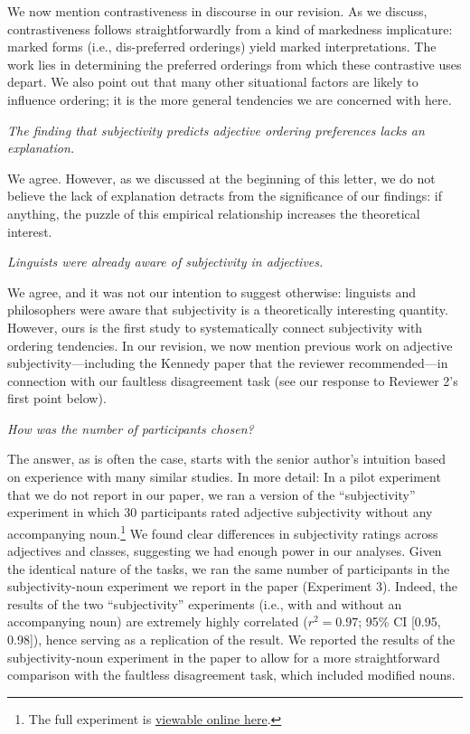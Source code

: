\documentclass[12pt]{article}
\begin{document}
We now mention contrastiveness in discourse in our revision. As we discuss, contrastiveness follows straightforwardly from a kind of markedness implicature: marked forms (i.e., dis-preferred orderings) yield marked interpretations. The work lies in determining the preferred orderings from which these contrastive uses depart.
We also point out that many other situational factors are likely to influence ordering; it is the more general tendencies we are concerned with here. %


\item \emph{The finding that subjectivity predicts adjective ordering preferences lacks an explanation.}

We agree. However, as we discussed at the beginning of this letter, we do not believe the lack of explanation detracts from the significance of our findings: if anything, the puzzle of this empirical relationship increases the theoretical interest.


\item \emph{Linguists were already aware of subjectivity in adjectives.}

We agree, and it was not our intention to suggest otherwise: linguists and philosophers were aware that subjectivity is a theoretically interesting quantity. However, ours is the first study to systematically connect subjectivity with ordering tendencies. In our revision, we now mention previous work on adjective subjectivity---including the Kennedy paper that the reviewer recommended---in connection with our faultless disagreement task (see our response to Reviewer 2's first point below).

\item \emph{How was the number of participants chosen?}

The answer, as is often the case, starts with the senior author's intuition based on experience with many similar studies. In more detail: In a pilot experiment that we do not report in our paper, we ran a version of the ``subjectivity'' experiment in which 30 participants rated adjective subjectivity without any accompanying noun.\footnote{The full experiment is \href{http://web.stanford.edu/~scontras/adjective_ordering/experiments/6-subjectivity/subjectivity.html}{viewable online here}.} We found clear differences in subjectivity ratings across adjectives and classes, suggesting we had enough power in our analyses. 
Given the identical nature of the tasks, we ran the same number of participants in the subjectivity-noun experiment we report in the paper (Experiment 3). Indeed, the results of the two ``subjectivity'' experiments (i.e., with and without an accompanying noun) are extremely highly correlated ($r^2=0.97$; 95\% CI [0.95,  0.98]), hence serving as a replication of the result. We reported the results of the subjectivity-noun experiment in the paper to allow for a more straightforward comparison with the faultless disagreement task, which included modified nouns.
\end{document}
